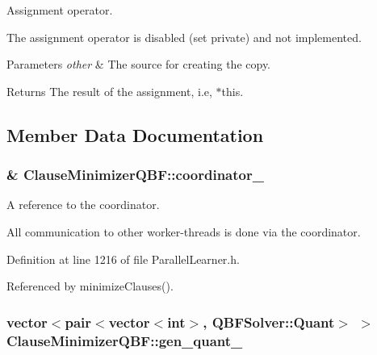Assignment operator. 

The assignment operator is disabled (set private) and not implemented.


\begin{DoxyParams}{Parameters}
{\em other} & The source for creating the copy. \\
\hline
\end{DoxyParams}
\begin{DoxyReturn}{Returns}
The result of the assignment, i.\-e, $\ast$this. 
\end{DoxyReturn}


\subsection{Member Data Documentation}
\hypertarget{classClauseMinimizerQBF_afff0ec1ad36fe55af388320c9b55f162}{
\subsubsection[{coordinator\-\_\-}]{\& Clause\-Minimizer\-Q\-B\-F\-::coordinator\-\_\-\hspace{0.3cm}{\ttfamily [protected]}}}\label{classClauseMinimizerQBF_afff0ec1ad36fe55af388320c9b55f162}


A reference to the coordinator. 

All communication to other worker-\/threads is done via the coordinator. 

Definition at line 1216 of file Parallel\-Learner.\-h.



Referenced by minimize\-Clauses().

\hypertarget{classClauseMinimizerQBF_a4bd08f4de32c9a738e48cae22b93fa22}{
\subsubsection[{gen\-\_\-quant\-\_\-}]{\setlength{\rightskip}{0pt plus 5cm}vector$<$pair$<$vector$<$int$>$, {\bf Q\-B\-F\-Solver\-::\-Quant}$>$ $>$ Clause\-Minimizer\-Q\-B\-F\-::gen\-\_\-quant\-\_\-\hspace{0.3cm}{\ttfamily [protected]}}}\label{classClauseMinimizerQBF_a4bd08f4de32c9a738e48cae22b93fa22}


